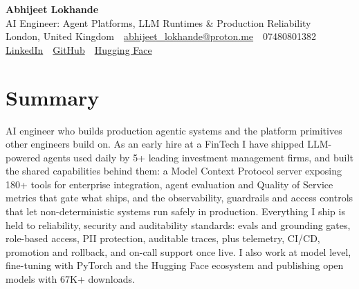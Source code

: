 \documentclass[10pt,a4paper]{article}
\newcommand{\sep}{\,\textcolor{accent!60}{\textbar}\,}
\begin{document}
\begin{center}
  {\fontsize{24}{26}\selectfont\bfseries Abhijeet Lokhande}\\[3pt]
  {\color{accent}\large AI Engineer: Agent Platforms, LLM Runtimes \& Production Reliability}\\[5pt]
  {\small
    London, United Kingdom \sep
    \href{mailto:abhijeet_lokhande@proton.me}{abhijeet\_lokhande@proton.me} \sep
    07480801382 \\[2pt]
    \href{https://www.linkedin.com/in/ablds/}{LinkedIn} \sep
    \href{https://github.com/abhijeetscode}{GitHub} \sep
    \href{https://huggingface.co/ab-ai}{Hugging Face}
  }
\end{center}
\vspace{2pt}

\section{Summary}
AI engineer who builds production agentic systems and the platform primitives other engineers build on. As an early hire at a FinTech I have shipped LLM-powered agents used daily by 5+ leading investment management firms, and built the shared capabilities behind them: a Model Context Protocol server exposing 180+ tools for enterprise integration, agent evaluation and Quality of Service metrics that gate what ships, and the observability, guardrails and access controls that let non-deterministic systems run safely in production. Everything I ship is held to reliability, security and auditability standards: evals and grounding gates, role-based access, PII protection, auditable traces, plus telemetry, CI/CD, promotion and rollback, and on-call support once live. I also work at model level, fine-tuning with PyTorch and the Hugging Face ecosystem and publishing open models with 67K+ downloads.

\end{document}
